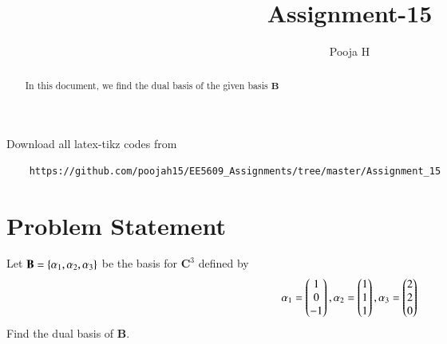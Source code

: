 \documentclass[journal,12pt,twocolumn]{IEEEtran}
\begin{document}
	\makeatother
	\let\StandardTheFigure\thefigure
	\let\vec\mathbf
	\renewcommand{\thefigure}{\theproblem}
	\def\putbox#1#2#3{\makebox[0in][l]{\makebox[#1][l]{}\raisebox{\baselineskip}[0in][0in]{\raisebox{#2}[0in][0in]{#3}}}}
	\def\rightbox#1{\makebox[0in][r]{#1}}
	\def\centbox#1{\makebox[0in]{#1}}
	\def\topbox#1{\raisebox{-\baselineskip}[0in][0in]{#1}}
	\def\midbox#1{\raisebox{-0.5\baselineskip}[0in][0in]{#1}}
	\vspace{3cm}
	\title{Assignment-15}
	\author{Pooja H }
	\maketitle
	\newpage
	\bigskip
	\renewcommand{\thefigure}{\theenumi}
	\renewcommand{\thetable}{\theenumi}
	\begin{abstract}
		In this document, we find the dual basis of the given basis $\vec{B}$ 
	\end{abstract}
	Download all latex-tikz codes from 
\begin{lstlisting}
	https://github.com/poojah15/EE5609_Assignments/tree/master/Assignment_15
\end{lstlisting}
	\section{Problem Statement}
	Let $\vec{B} = \cbrak{\alpha_1, \alpha_2, \alpha_3}$ be the basis for $\vec{C}^3$ defined by
	\begin{align}
		\alpha_1 = \begin{pmatrix}1\\0\\-1\end{pmatrix}, \alpha_2 = \begin{pmatrix}1\\1\\1\end{pmatrix}, \alpha_3 = \begin{pmatrix}2\\2\\0\end{pmatrix}  
	\end{align}
Find the dual basis of $\vec{B}$.
\end{document}
